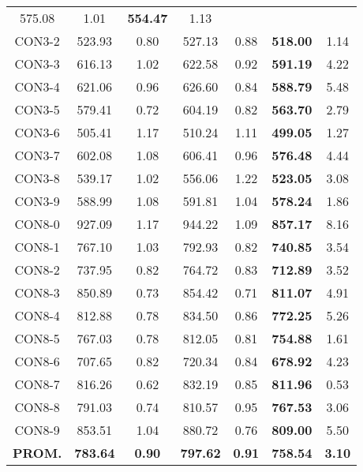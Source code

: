 \begin{table}[ht]
\begin{tabular}{c c c c c c c}
575.08 & 1.01 & \bf{554.47} & 
1.13\\CON3-2 & 523.93 & 0.80 & 
527.13 & 0.88 & \bf{518.00} & 
1.14\\CON3-3 & 616.13 & 1.02 & 
622.58 & 0.92 & \bf{591.19} & 
4.22\\CON3-4 & 621.06 & 0.96 & 
626.60 & 0.84 & \bf{588.79} & 
5.48\\CON3-5 & 579.41 & 0.72 & 
604.19 & 0.82 & \bf{563.70} & 
2.79\\CON3-6 & 505.41 & 1.17 & 
510.24 & 1.11 & \bf{499.05} & 
1.27\\CON3-7 & 602.08 & 1.08 & 
606.41 & 0.96 & \bf{576.48} & 
4.44\\CON3-8 & 539.17 & 1.02 & 
556.06 & 1.22 & \bf{523.05} & 
3.08\\CON3-9 & 588.99 & 1.08 & 
591.81 & 1.04 & \bf{578.24} & 
1.86\\CON8-0 & 927.09 & 1.17 & 
944.22 & 1.09 & \bf{857.17} & 
8.16\\CON8-1 & 767.10 & 1.03 & 
792.93 & 0.82 & \bf{740.85} & 
3.54\\CON8-2 & 737.95 & 0.82 & 
764.72 & 0.83 & \bf{712.89} & 
3.52\\CON8-3 & 850.89 & 0.73 & 
854.42 & 0.71 & \bf{811.07} & 
4.91\\CON8-4 & 812.88 & 0.78 & 
834.50 & 0.86 & \bf{772.25} & 
5.26\\CON8-5 & 767.03 & 0.78 & 
812.05 & 0.81 & \bf{754.88} & 
1.61\\CON8-6 & 707.65 & 0.82 & 
720.34 & 0.84 & \bf{678.92} & 
4.23\\CON8-7 & 816.26 & 0.62 & 
832.19 & 0.85 & \bf{811.96} & 
0.53\\CON8-8 & 791.03 & 0.74 & 
810.57 & 0.95 & \bf{767.53} & 
3.06\\CON8-9 & 853.51 & 1.04 & 
880.72 & 0.76 & \bf{809.00} & 
5.50\\\bf{PROM.} & 
\bf{783.64} & \bf{0.90} & \bf{797.62} & \bf{0.91} & \bf{758.54} & \bf{3.10}\\[1ex]\hline
\end{tabular}
\label{table:nonlin}
\end{table} \clearpage
